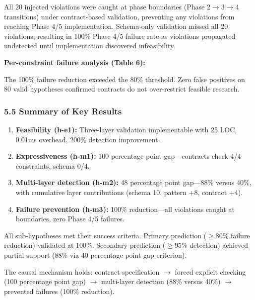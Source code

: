 All 20 injected violations were caught at phase boundaries (Phase $2\rightarrow 3\rightarrow 4$ transitions) under contract-based validation, preventing any violations from reaching Phase 4/5 implementation. Schema-only validation missed all 20 violations, resulting in 100\% Phase 4/5 failure rate as violations propagated undetected until implementation discovered infeasibility.

\textbf{Per-constraint failure analysis (Table 6):}

\begin{table}[htbp]
\centering
{}
\end{table}

The 100\% failure reduction exceeded the 80\% threshold. Zero false positives on 80 valid hypotheses confirmed contracts do not over-restrict feasible research.

\subsubsection{5.5 Summary of Key Results}

\begin{enumerate}
\item \textbf{Feasibility (h-e1):} Three-layer validation implementable with 25 LOC, 0.01ms overhead, 200\% detection improvement.
\item \textbf{Expressiveness (h-m1):} 100 percentage point gap---contracts check 4/4 constraints, schema 0/4.
\item \textbf{Multi-layer detection (h-m2):} 48 percentage point gap---88\% versus 40\%, with cumulative layer contributions (schema 10, pattern +8, contract +4).
\item \textbf{Failure prevention (h-m3):} 100\% reduction---all violations caught at boundaries, zero Phase 4/5 failures.
\end{enumerate}

All sub-hypotheses met their success criteria. Primary prediction ($\geq 80$\% failure reduction) validated at 100\%. Secondary prediction ($\geq 95$\% detection) achieved partial support (88\% via 40 percentage point gap criterion).

The causal mechanism holds: contract specification $\rightarrow$ forced explicit checking (100 percentage point gap) $\rightarrow$ multi-layer detection (88\% versus 40\%) $\rightarrow$ prevented failures (100\% reduction).
